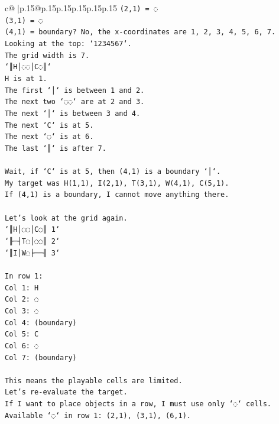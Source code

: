 \documentclass{article}
\begin{document}
{\begin{supertabular}{c@{$\;$}|p{.15\linewidth}@{}p{.15\linewidth}p{.15\linewidth}p{.15\linewidth}p{.15\linewidth}p{.15\linewidth}}
{{{\texttt{(2,1) = ◌} \\
\texttt{(3,1) = ◌} \\
\texttt{(4,1) = boundary? No, the x{-}coordinates are 1, 2, 3, 4, 5, 6, 7.} \\
\texttt{Looking at the top: `1234567`.} \\
\texttt{The grid width is 7.} \\
\texttt{`║H│◌◌│C◌║`} \\
\texttt{H is at 1.} \\
\texttt{The first `│` is between 1 and 2.} \\
\texttt{The next two `◌◌` are at 2 and 3.} \\
\texttt{The next `│` is between 3 and 4.} \\
\texttt{The next `C` is at 5.} \\
\texttt{The next `◌` is at 6.} \\
\texttt{The last `║` is after 7.} \\
\\ 
\texttt{Wait, if `C` is at 5, then (4,1) is a boundary `│`.} \\
\texttt{My target was H(1,1), I(2,1), T(3,1), W(4,1), C(5,1).} \\
\texttt{If (4,1) is a boundary, I cannot move anything there.} \\
\\ 
\texttt{Let's look at the grid again.} \\
\texttt{`║H│◌◌│C◌║ 1`} \\
\texttt{`╟─┤T◌│◌◌║ 2`} \\
\texttt{`║I│W◌├──╢ 3`} \\
\\ 
\texttt{In row 1:} \\
\texttt{Col 1: H} \\
\texttt{Col 2: ◌} \\
\texttt{Col 3: ◌} \\
\texttt{Col 4: (boundary)} \\
\texttt{Col 5: C} \\
\texttt{Col 6: ◌} \\
\texttt{Col 7: (boundary)} \\
\\ 
\texttt{This means the playable cells are limited.} \\
\texttt{Let's re{-}evaluate the target.} \\
\texttt{If I want to place objects in a row, I must use only `◌` cells.} \\
\texttt{Available `◌` in row 1: (2,1), (3,1), (6,1).} \\
}}}
\end{supertabular}}
\end{document}

